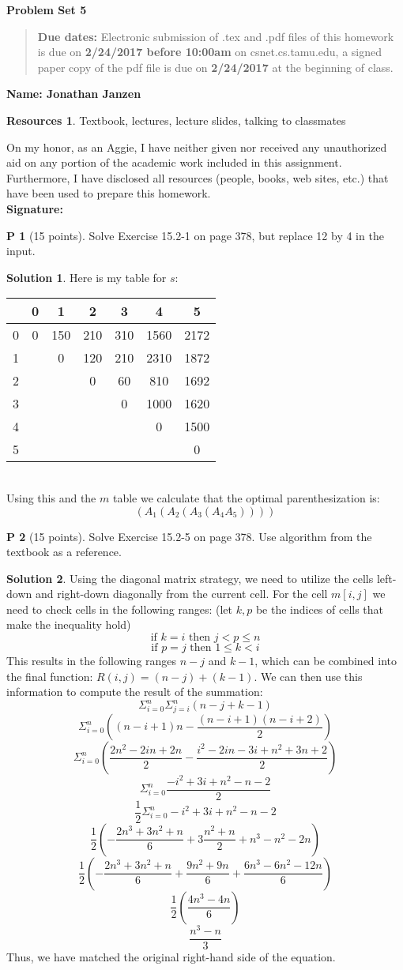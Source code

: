 \documentclass{article}
\theoremstyle{definition}
\newtheorem{problem}{P}
\newtheorem*{solution}{Solution}
\newtheorem*{resources}{Resources}
\newcommand{\name}[1]{\noindent\textbf{Name: #1}}
\newcommand{\honor}{\noindent On my honor, as an Aggie, I have neither
  given nor received any unauthorized aid on any portion of the
  academic work included in this assignment. Furthermore, I have
  disclosed all resources (people, books, web sites, etc.) that have
  been used to prepare this homework. \\[1ex]
 \textbf{Signature:} \underline{\hspace*{5cm}} }
\newcommand{\problemset}[1]{\begin{center}\textbf{Problem Set #1}\end{center}}
\newcommand{\duedate}[2]{\begin{quote}\textbf{Due dates:} Electronic submission of .tex
    and .pdf files of this homework is due on \textbf{#1} on csnet.cs.tamu.edu, a signed paper copy
    of the pdf file is due on \textbf{#2} at the beginning of
    class. \end{quote} }
\begin{document}
\problemset{5}
\duedate{2/24/2017 before 10:00am}{2/24/2017}
\name{Jonathan Janzen}
\begin{resources}
Textbook, lectures, lecture slides, talking to classmates
\end{resources}
\honor
\newpage


\begin{problem}[15 points]
Solve Exercise 15.2-1 on page 378, but replace 12 by 4 in the input. 
\end{problem}
\begin{solution}
Here is my table for $s$:\\
\begin{tabular}{| c | c c c c c c |}
\hline
 & 0 & 1 & 2 & 3 & 4 & 5\\
 \hline
0 & 0 & 150 & 210 & 310 & 1560 & 2172\\
1 &  & 0 & 120 & 210 & 2310 & 1872\\
2 &  &  & 0 & 60 & 810 & 1692\\
3 &  &  &  & 0 & 1000 & 1620\\
4 &  &  &  &  & 0 & 1500\\
5 &  &  &  &  &  & 0\\
\hline
\end{tabular}\\
Using this and the $m$ table we calculate that the optimal parenthesization is:
$$(A_1(A_2(A_3(A_4A_5))))$$
\end{solution}

\begin{problem}[15 points]
Solve Exercise 15.2-5 on page 378. Use algorithm from the textbook as
a reference. 
\end{problem}
\begin{solution}
Using the diagonal matrix strategy, we need to utilize the cells left-down and right-down diagonally from the current cell. For the cell $m[i, j]$ we need to check cells in the following ranges: (let $k,p$ be the indices of cells that make the inequality hold)\\
$$\text{if } k=i \text{ then } j < p \leq n$$
$$\text{if } p=j \text{ then } 1 \leq k < i$$
This results in the following ranges $n-j$ and $k-1$, which can be combined into the final function: $R(i,j) = (n-j) + (k-1)$. We can then use this information to compute the result of the summation:
$$ \Sigma_{i=0}^n \Sigma_{j=i}^n (n - j + k - 1) $$
$$ \Sigma_{i=0}^n ((n-i+1)n - \frac{(n-i+1)(n-i+2)}{2}) $$
$$ \Sigma_{i=0}^n (\frac{2n^2-2in+2n}{2} - \frac{i^2-2in-3i+n^2+3n+2}{2}) $$
$$ \Sigma_{i=0}^n \frac{-i^2+3i+n^2-n-2}{2} $$
$$ \frac{1}{2} \Sigma_{i=0}^n -i^2+3i+n^2-n-2 $$
$$ \frac{1}{2} (-\frac{2n^3+3n^2+n}{6}+3\frac{n^2 + n}{2}+n^3-n^2-2n) $$
$$ \frac{1}{2} (-\frac{2n^3+3n^2+n}{6}+\frac{9n^2 + 9n}{6}+\frac{6n^3-6n^2-12n}{6}) $$
$$ \frac{1}{2} (\frac{4n^3-4n}{6}) $$
$$ \frac{n^3-n}{3} $$
Thus, we have matched the original right-hand side of the equation.
\end{solution}
\end{document}
